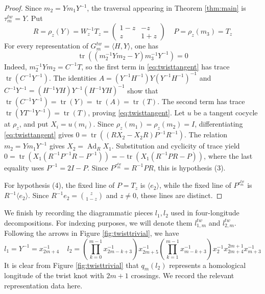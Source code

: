 \documentclass{article}
\DeclareMathOperator{\tr}{tr}
\newcommand{\Ad}{\operatorname{Ad}}
\theoremstyle{plain}
\theoremstyle{definition}
\theoremstyle{plain}
\theoremstyle{plain}
\theoremstyle{plain}
\theoremstyle{remark}
\theoremstyle{remark}
\theoremstyle{plain}
\theoremstyle{plain}
\newcounter{main}
\theoremstyle{plain}
\theoremstyle{plain}
\begin{document}
\begin{proof}
Since $m_2 = Ym_1Y^{-1}$, the traversal appearing in Theorem \ref{thm:main} is $\tau_m^{tw} = Y$. Put 
\begin{equation*}
	R = \rho_z(Y) = W_z^{-1}T_z = \begin{pmatrix}1-z&-z\\z&1+z\end{pmatrix} \ \ \ \ \ P= \rho_z(m_3) = T_z
\end{equation*}
For every representation of $G_m^{tw} = \langle H, Y \rangle$, one has
\begin{equation}\label{eq:twisttangent}
	\tr((m_2^{-1}Ym_2-Y)m_3^{-1}Y^{-1}) = 0
\end{equation}
Indeed, $m_2^{-1}Ym_2 = C^{-1}T$, so the first term in \eqref{eq:twisttangent} has trace $\tr(C^{-1}Y^{-1})$. The identities $A = (Y^{-1}H^{-1})Y(Y^{-1}H^{-1})^{-1}$ and $C^{-1}Y^{-1} = (H^{-1}YH)Y^{-1}(H^{-1}YH)^{-1}$ show that $\tr(C^{-1}Y^{-1}) = \tr(Y) = \tr(A) = \tr(T)$. The second term has trace $\tr(YT^{-1}Y^{-1}) = \tr(T)$, proving \eqref{eq:twisttangent}. Let $u$ be a tangent cocycle at $\rho_z$, and put $X_i = u(m_i)$. Since $\rho_z(m_1) = \rho_z(m_2) = I$, differentiating \eqref{eq:twisttangent} gives $0 = \tr((RX_2-X_2R)P^{-1}R^{-1})$. The relation $m_2 = Ym_1Y^{-1}$ gives $X_2 = \Ad_RX_1$. Substitution and cyclicity of trace yield $0 = \tr(X_1(R^{-1}P^{-1}R - P^{-1})) = -\tr(X_1(R^{-1}PR - P))$, where the last equality uses $P^{-1} = 2I-P$. Since $P^{\tau_m^{tw}} = R^{-1}PR$, this is hypothesis (3). 

\medskip

For hypothesis (4), the fixed line of $P = T_z$ is $\langle e_2 \rangle$, while the fixed line of $P^{\tau_m^{tw}}$ is $R^{-1}\langle e_2 \rangle$. Since $R^{-1}e_2 = \binom{z}{1-z}$ and $z \neq 0$, these lines are distinct. 
\end{proof}

We finish by recording the diagrammatic pieces $l_1, l_2$ used in four-longitude decompositions. For indexing purposes, we will denote them $l_{1,m}^{tw}$ and $l_{2,m}^{tw}$. Following the arrows in Figure \ref{fig:twisttrivial}, we have 
\begin{equation*}
	l_1 = Y^{-1} = x_{2m+4}^{-1} \ \ \ \ \ l_2 = \left(\prod_{k=0}^{m-1}x_{2m-k+3}^{-1}\right)x_{2m+5}^{-1}\left(\prod_{k=1}^{m-1}x_{m-k+3}^{-1}\right)x_2^{-1}x_{2m+4}^{2m+1}x_{m+3}^{-1}
\end{equation*}
It is clear from Figure \ref{fig:twisttrivial} that $q_m(l_2)$ represents a homological longitude of the twist knot with $2m+1$ crossings. We record the relevant representation data here.
\end{document}
